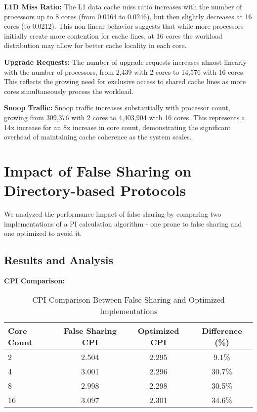 \documentclass[9pt]{IEEEtran}
\begin{document}
\textbf{L1D Miss Ratio:} The L1 data cache miss ratio increases with the number of processors up to 8 cores (from 0.0164 to 0.0246), but then slightly decreases at 16 cores (to 0.0212). This non-linear behavior suggests that while more processors initially create more contention for cache lines, at 16 cores the workload distribution may allow for better cache locality in each core.

\textbf{Upgrade Requests:} The number of upgrade requests increases almost linearly with the number of processors, from 2,439 with 2 cores to 14,576 with 16 cores. This reflects the growing need for exclusive access to shared cache lines as more cores simultaneously process the workload.

\textbf{Snoop Traffic:} Snoop traffic increases substantially with processor count, growing from 309,376 with 2 cores to 4,403,904 with 16 cores. This represents a 14x increase for an 8x increase in core count, demonstrating the significant overhead of maintaining cache coherence as the system scales.

\section{Impact of False Sharing on Directory-based Protocols}
We analyzed the performance impact of false sharing by comparing two implementations of a PI calculation algorithm - one prone to false sharing and one optimized to avoid it.

\subsection{Results and Analysis}

\textbf{CPI Comparison:}

\begin{table}[htbp]
\centering
\caption{CPI Comparison Between False Sharing and Optimized Implementations}
\begin{adjustbox}{max width=\columnwidth}
\begin{tabular}{@{}lccc@{}}
\toprule
Core Count & False Sharing CPI & Optimized CPI & Difference (\%) \\
\midrule
2  & 2.504 & 2.295 & 9.1\% \\
4  & 3.001 & 2.296 & 30.7\% \\
8  & 2.998 & 2.298 & 30.5\% \\
16 & 3.097 & 2.301 & 34.6\% \\
\bottomrule
\end{tabular}
\end{adjustbox}
\end{table}
\end{document}
